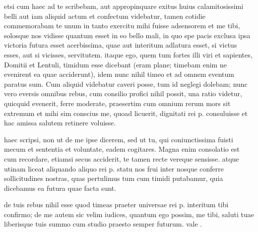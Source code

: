 


 etsi cum haec ad te scribebam, aut appropinquare exitus huius calamitosissimi belli aut iam aliquid actum et confectum videbatur, tamen cotidie commemorabam te unum in tanto exercitu mihi fuisse adsensorem et me tibi, solosque nos vidisse quantum esset in eo bello mali, in quo spe pacis exclusa ipsa victoria futura esset acerbissima, quae aut interitum adlatura esset, si victus esses, aut si vicisses, servitutem. itaque ego, quem tum fortes illi viri et sapientes, Domitii et Lentuli, timidum esse dicebant (eram plane; timebam enim ne evenirent ea quae acciderunt), idem nunc nihil timeo et ad omnem eventum paratus sum. Cum aliquid videbatur caveri posse, tum id neglegi dolebam; nunc vero eversis omnibus rebus, cum consilio profici nihil possit, una ratio videtur, quicquid evenerit, ferre moderate, praesertim cum omnium rerum mors sit extremum et mihi sim conscius me, quoad licuerit, dignitati rei p. consuluisse et hac amissa salutem retinere voluisse.

 haec scripsi, non ut de me ipse dicerem, sed ut tu, qui coniunctissima fuisti mecum et sententia et voluntate, eadem cogitares. Magna enim consolatio est cum recordare, etiamsi secus acciderit, te tamen recte vereque sensisse. atque utinam liceat aliquando aliquo rei p. statu nos frui inter nosque conferre sollicitudines nostras, quas pertulimus tum cum timidi putabamur, quia dicebamus ea futura quae facta sunt.

 de tuis rebus nihil esse quod timeas praeter universae rei p. interitum tibi confirmo; de me autem sic velim iudices, quantum ego possim, me tibi, saluti tuae liberisque tuis summo cum studio praesto semper futurum. vale .
